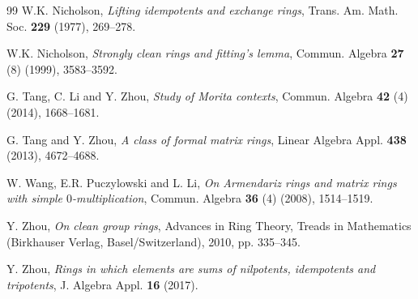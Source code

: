 \documentclass[12pt]{amsart}
\theoremstyle{definition}
\begin{document}
\begin{thebibliography}{99}
W.K. Nicholson, {\it Lifting idempotents and exchange rings}, Trans. Am. Math. Soc. {\bf 229} (1977), 269--278.

W.K. Nicholson, {\it Strongly clean rings and fitting's lemma}, Commun. Algebra {\bf 27} (8) (1999), 3583--3592.

G. Tang, C. Li and Y. Zhou, {\it Study of Morita contexts}, Commun. Algebra {\bf 42} (4) (2014), 1668--1681.

G. Tang and Y. Zhou, {\it A class of formal matrix rings}, Linear Algebra Appl. {\bf 438} (2013), 4672--4688.

W. Wang, E.R. Puczylowski and L. Li, {\it On Armendariz rings and matrix rings with simple $0$-multiplication}, Commun. Algebra {\bf 36} (4) (2008), 1514--1519.

Y. Zhou, {\it On clean group rings}, Advances in Ring Theory, Treads in Mathematics (Birkhauser Verlag, Basel/Switzerland), 2010, pp. 335--345.

Y. Zhou, {\it Rings in which elements are sums of nilpotents, idempotents and tripotents}, J. Algebra Appl. {\bf 16} (2017).

\end{thebibliography}
\end{document}
